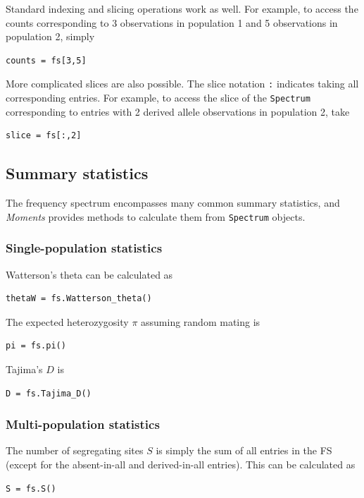 \documentclass[12pt]{article}
\makeatletter
\newcommand{\py}[1]{\lstinline[breaklines=true,language=Python, showstringspaces=False]@#1@}
\makeatother
\begin{document}
Standard indexing and slicing operations work as well.
For example, to access the counts corresponding to 3 observations in population 1 and 5 observations in population 2, simply
\begin{lstlisting}
counts = fs[3,5]
\end{lstlisting}
More complicated slices are also possible.
The slice notation \py{:} indicates taking all corresponding entries.
For example, to access the slice of the \py{Spectrum} corresponding to entries with 2 derived allele observations in population 2, take
\begin{lstlisting}
slice = fs[:,2]
\end{lstlisting}

\subsection{Summary statistics}

The frequency spectrum encompasses many common summary statistics, and \textit{Moments} provides methods to calculate them from \py{Spectrum} objects.

\subsubsection{Single-population statistics}

Watterson's theta can be calculated as
\begin{lstlisting}
thetaW = fs.Watterson_theta()
\end{lstlisting}

The expected heterozygosity $\pi$ assuming random mating is
\begin{lstlisting}
pi = fs.pi()
\end{lstlisting}

Tajima's $D$ is
\begin{lstlisting}
D = fs.Tajima_D()
\end{lstlisting}

\subsubsection{Multi-population statistics}

The number of segregating sites $S$ is simply the sum of all entries in the FS (except for the absent-in-all and derived-in-all entries).
This can be calculated as
\begin{lstlisting}
S = fs.S()
\end{lstlisting}
\end{document}
